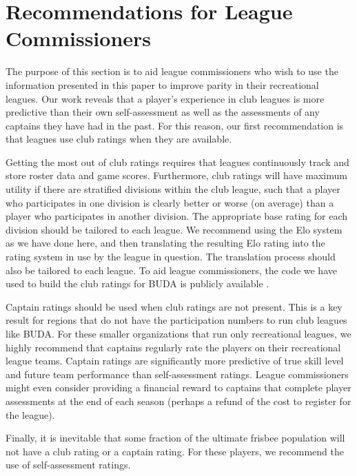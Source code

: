 \section{Recommendations for League Commissioners}\label{sec:recommendations}

The purpose of this section is to aid league commissioners who wish to use the information presented in this paper to improve parity in their recreational leagues. Our work reveals that a player's experience in club leagues is more predictive than their own self-assessment as well as the assessments of any captains they have had in the past. For this reason, our first recommendation is that leagues use club ratings when they are available. 

Getting the most out of club ratings requires that leagues continuously track and store roster data and game scores. Furthermore, club ratings will have maximum utility if there are stratified divisions within the club league, such that a player who participates in one division is clearly better or worse (on average) than a player who participates in another division. The appropriate base rating for each division should be tailored to each league. We recommend using the Elo system as we have done here, and then translating the resulting Elo rating into the rating system in use by the league in question. The translation process should also be tailored to each league. To aid league commissioners, the code we have used to build the club ratings for BUDA is publicly available \cite{shanegit}.

Captain ratings should be used when club ratings are not present. This is a key result for regions that do not have the participation numbers to run club leagues like BUDA. For these smaller organizations that run only recreational leagues, we highly recommend that captains regularly rate the players on their recreational league teams. Captain ratings are significantly more predictive of true skill level and future team performance than self-assessment ratings. League commissioners might even consider providing a financial reward to captains that complete player assessments at the end of each season (perhaps a refund of the cost to register for the league).

Finally, it is inevitable that some fraction of the ultimate frisbee population will not have a club rating or a captain rating. For these players, we recommend the use of self-assessment ratings.